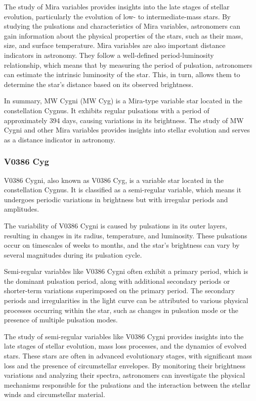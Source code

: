 The study of Mira variables provides insights into the late stages of stellar evolution, particularly the evolution of low- to intermediate-mass stars. By studying the pulsations and characteristics of Mira variables, astronomers can gain information about the physical properties of the stars, such as their mass, size, and surface temperature. Mira variables are also important distance indicators in astronomy. They follow a well-defined period-luminosity relationship, which means that by measuring the period of pulsation, astronomers can estimate the intrinsic luminosity of the star. This, in turn, allows them to determine the star's distance based on its observed brightness.

In summary, MW Cygni (MW Cyg) is a Mira-type variable star located in the constellation Cygnus. It exhibits regular pulsations with a period of approximately 394 days, causing variations in its brightness. The study of MW Cygni and other Mira variables provides insights into stellar evolution and serves as a distance indicator in astronomy.


\subsubsection*{ V0386 Cyg }
V0386 Cygni, also known as V0386 Cyg, is a variable star located in the constellation Cygnus. It is classified as a semi-regular variable, which means it undergoes periodic variations in brightness but with irregular periods and amplitudes.

The variability of V0386 Cygni is caused by pulsations in its outer layers, resulting in changes in its radius, temperature, and luminosity. These pulsations occur on timescales of weeks to months, and the star's brightness can vary by several magnitudes during its pulsation cycle.

Semi-regular variables like V0386 Cygni often exhibit a primary period, which is the dominant pulsation period, along with additional secondary periods or shorter-term variations superimposed on the primary period. The secondary periods and irregularities in the light curve can be attributed to various physical processes occurring within the star, such as changes in pulsation mode or the presence of multiple pulsation modes.

The study of semi-regular variables like V0386 Cygni provides insights into the late stages of stellar evolution, mass loss processes, and the dynamics of evolved stars. These stars are often in advanced evolutionary stages, with significant mass loss and the presence of circumstellar envelopes. By monitoring their brightness variations and analyzing their spectra, astronomers can investigate the physical mechanisms responsible for the pulsations and the interaction between the stellar winds and circumstellar material.

